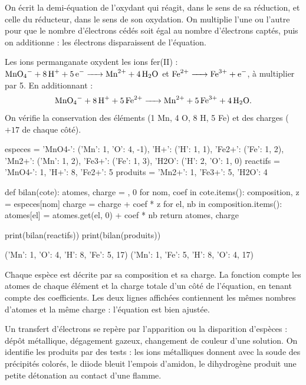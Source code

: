 \begin{propriete}
On écrit la demi-équation de l'oxydant qui réagit, dans le sens de sa réduction, et celle du réducteur, dans le sens de
son oxydation. On multiplie l'une ou l'autre pour que le nombre d'électrons cédés soit égal au nombre d'électrons captés,
puis on additionne : les électrons disparaissent de l'équation.
\end{propriete}
\begin{exemple}
Les ions permanganate oxydent les ions fer(II) : $\ce{MnO4- + 8H+ + 5e- -> Mn^{2+} + 4H2O}$ et $\ce{Fe^{2+} -> Fe^{3+} + e-}$, à
multiplier par 5. En additionnant :
\[\ce{MnO4- + 8H+ + 5Fe^{2+} -> Mn^{2+} + 5Fe^{3+} + 4H2O}.\]
On vérifie la conservation des éléments (1 Mn, 4 O, 8 H, 5 Fe) et des charges ($+17$ de chaque côté).
\end{exemple}
\begin{python}
especes = {'MnO4-': ({'Mn': 1, 'O': 4}, -1), 'H+': ({'H': 1}, 1),
           'Fe2+': ({'Fe': 1}, 2), 'Mn2+': ({'Mn': 1}, 2),
           'Fe3+': ({'Fe': 1}, 3), 'H2O': ({'H': 2, 'O': 1}, 0)}
reactifs = {'MnO4-': 1, 'H+': 8, 'Fe2+': 5}
produits = {'Mn2+': 1, 'Fe3+': 5, 'H2O': 4}

def bilan(cote):
    atomes, charge = {}, 0
    for nom, coef in cote.items():
        composition, z = especes[nom]
        charge = charge + coef * z
        for el, nb in composition.items():
            atomes[el] = atomes.get(el, 0) + coef * nb
    return atomes, charge

print(bilan(reactifs))
print(bilan(produits))
\end{python}
\begin{console}
({'Mn': 1, 'O': 4, 'H': 8, 'Fe': 5}, 17)
({'Mn': 1, 'Fe': 5, 'H': 8, 'O': 4}, 17)
\end{console}
\noindent{} Chaque espèce est décrite par sa composition et sa charge. La fonction  compte les atomes de
chaque élément et la charge totale d'un côté de l'équation, en tenant compte des coefficients. Les deux lignes affichées
contiennent les mêmes nombres d'atomes et la même charge : l'équation est bien ajustée.
\begin{propriete}
Un transfert d'électrons se repère par l'apparition ou la disparition d'espèces : dépôt métallique, dégagement gazeux,
changement de couleur d'une solution. On identifie les produits par des tests : les ions métalliques donnent avec la soude
des précipités colorés, le diiode bleuit l'empois d'amidon, le dihydrogène produit une petite détonation au contact d'une
flamme.
\end{propriete}
